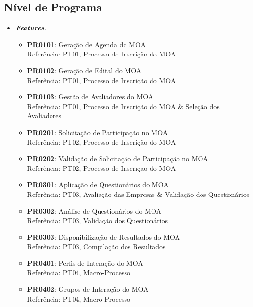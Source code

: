 \subsection[Nível de Programa]{Nível de Programa}
\label{subsec:requisitos_levantamento_programa}
	\begin{itemize}
		\item{\textbf{\emph{Features}}:
			\begin{itemize}
				\item{\textbf{PR0101}: Geração de Agenda do MOA
				\\ Referência: PT01, Processo de Inscrição do MOA}
				\item{\textbf{PR0102}: Geração de Edital do MOA
				\\ Referência: PT01, Processo de Inscrição do MOA}
				\item{\textbf{PR0103}: Gestão de Avaliadores do MOA
				\\ Referência: PT01, Processo de Inscrição do MOA \& Seleção dos Avaliadores}
				\item{\textbf{PR0201}: Solicitação de Participação no MOA
				\\ Referência: PT02, Processo de Inscrição do MOA}
				\item{\textbf{PR0202}: Validação de Solicitação de Participação no MOA
				\\ Referência: PT02, Processo de Inscrição do MOA}
				\item{\textbf{PR0301}: Aplicação de Questionários do MOA
				\\ Referência: PT03, Avaliação das Empresas \& Validação dos Questionários}
				\item{\textbf{PR0302}: Análise de Questionários do MOA
				\\ Referência: PT03, Validação dos Questionários}
				\item{\textbf{PR0303}: Disponibilização de Resultados do MOA
				\\ Referência: PT03, Compilação dos Resultados}
				\item{\textbf{PR0401}: Perfis de Interação do MOA
				\\ Referência: PT04, Macro-Processo}
				\item{\textbf{PR0402}: Grupos de Interação do MOA
				\\ Referência: PT04, Macro-Processo}
			\end{itemize}}
	\end{itemize}

